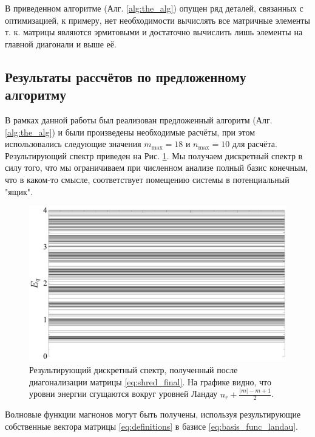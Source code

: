 \documentclass[a4paper,article,14pt]{extarticle}
\begin{document}
В приведенном алгоритме (Алг. \ref{alg:the_alg}) опущен ряд деталей, связанных с оптимизацией, к примеру, нет необходимости вычислять все матричные элементы т. к. матрицы являются эрмитовыми и достаточно вычислить лишь элементы на главной диагонали и выше её.

\pagebreak
\subsection{ Результаты рассчётов по предложенному алгоритму }

В рамках данной работы был реализован предложенный алгоритм (Алг. \ref{alg:the_alg}) и были произведены необходимые расчёты, при этом использовались следующие значения $m_\text{max}=18$ и $n_\text{max}=10$ для расчёта. Результирующий спектр приведен на Рис.  \ref{fig:landau_spectrum}. Мы получаем дискретный спектр в силу того, что мы ограничиваем при численном анализе полный базис конечным, что в каком-то смысле, соответствует помещению системы в потенциальный "ящик".

\begin{figure}[t]
\centering	
\includegraphics[width=0.95\columnwidth]{images/spectrum_landau.pdf}
\caption{Результирующий дискретный спектр, полученный после диагонализации матрицы \eqref{eq:shred_final}. На графике видно, что уровни энергии сгущаются вокруг уровней Ландау $n_r + \frac{|m| - m + 1}{2}$. }
\label{fig:landau_spectrum}
\end{figure}

Волновые функции магнонов могут быть получены, используя результирующие собственные вектора матрицы \eqref{eq:definitions} в базисе \eqref{eq:basis_func_landau}.
\end{document}
